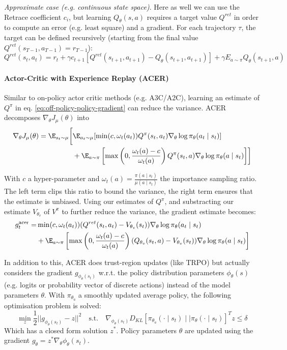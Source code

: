 \emph{Approximate case (e.g. continuous state space)}.
Here as well we can use the Retrace coefficient $c_i$, but learning $Q_\theta(s,a)$ requires a target value $Q^{ret}$ in order to compute an error (e.g. least square) and a gradient. For each trajectory $\tau$, the target can be defined recursively (starting from the final value $Q^{ret}(s_{T-1}, a_{T-1}) = r_{T-1}$):
\[
Q^{ret}(s_t, a_t) = r_t + \gamma c_{t+1} [Q^{ret}(s_{t+1}, a_{t+1}) - Q_\theta(s_{t+1}, a_{t+1})] + \gamma E_{a\sim \pi} Q_\theta(s_{t+1}, a)
\]

\paragraph{Actor-Critic with Experience Replay (ACER)} \cite{wang2016sample}
Similar to on-policy actor critic methods (e.g. A3C/A2C), learning an estimate of $Q^\pi$ in eq. \ref{eq:off-policy-policy-gradient} can reduce the variance. ACER decomposes $\nabla_\theta J_\mu(\theta)$ into
\begin{align*}
\nabla_\theta J_\mu(\theta) = \E_{s_t\sim \mu} \biggl[
    & \E_{a_t\sim \mu}[
        \min(c, \omega_t(a_t)) Q^\pi(s_t, a_t) \nabla_\theta \log \pi_\theta(a_t\mid s_t)
    ] \\
    & + \E_{a\sim \pi}\left[
        \max\left(0, \frac{\omega_t(a)-c}{\omega_t(a)}\right) Q^\pi(s_t, a) \nabla_\theta \log \pi_\theta(a\mid s_t)
    \right]
\biggr]
\end{align*}

With $c$ a hyper-parameter and $\omega_t(a) = \frac{\pi(a\mid s_t)}{\mu(a\mid s_t)}$ the importance sampling ratio. The left term clips this ratio to bound the variance, the right term ensures that the estimate is unbiased. Using our estimates of $Q^\pi$, and substracting our estimate $V_{\theta_v}$ of $V^\pi$ to further reduce the variance, the gradient estimate becomes:
\begin{align*}
    g_t^\text{acer} = 
    & \min(c, \omega_t(a_t)) (Q^{ret}(s_t, a_t) - V_{\theta_v}(s_t)) \nabla_\theta \log \pi_\theta(a_t\mid s_t) \\
    &+ \E_{a\sim \pi}\left[
        \max\left(0, \frac{\omega_t(a)-c}{\omega_t(a)}\right) 
        (Q_{\theta_v}(s_t, a) - V_{\theta_v}(s_t)) \nabla_\theta \log \pi_\theta(a\mid s_t)
    \right]
\end{align*}

In addition to this, ACER does trust-region updates (like TRPO) but actually considers the gradient $g_{\phi_\theta(s_t)}$ w.r.t. the policy distribution parameters $\phi_\theta(s)$ (e.g. logits or probability vector of discrete actions) instead of the model parameters $\theta$. With $\pi_{\theta_a}$ a smoothly updated average policy, the following optimisation problem is solved: 
\[
    \min_z \frac{1}{2} ||g_{\phi_\theta(s_t)} - z||^2 \quad \text{s.t.} \quad
    \nabla_{\phi_\theta(s_t)} D_{KL}[
        \pi_{\theta_a}(\cdot \mid s_t) \mid \mid \pi_\theta(\cdot \mid s_t)
    ]^T z \leq \delta
\]
Which has a closed form solution $z^*$. Policy parameters $\theta$ are updated using the gradient $g_\theta = z^* \nabla_\theta \phi_\theta(s_t)$.


